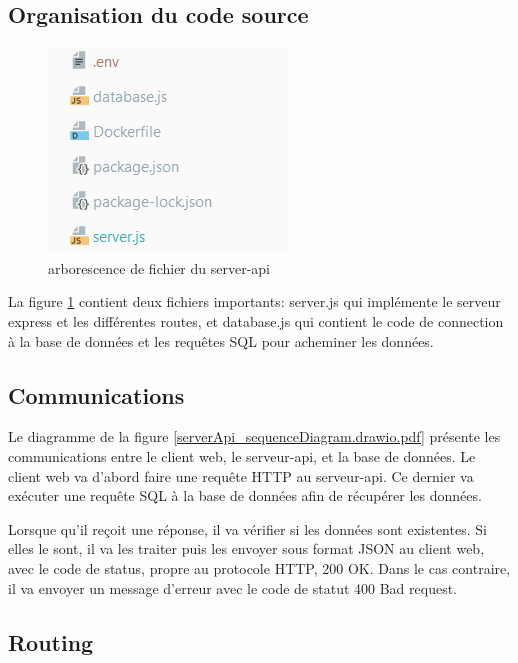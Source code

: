 \documentclass[
    iai, %
    il, %
]{heig-tb}
\begin{document}
\subsection{Organisation du code source}

\begin{figure}[h]
    \centering
    \includegraphics[scale=0.9]{backend_source_code.png}
    \caption{arborescence de fichier du server-api}
    \label{fig:backend_source_files}
\end{figure}

La figure \ref{fig:backend_source_files} contient deux fichiers importants: server.js qui implémente le serveur express et les différentes routes,
et database.js qui contient le code de connection à la base de données et les requêtes SQL pour acheminer les données.

\subsection{Communications}


Le diagramme de la figure \ref{serverApi_sequenceDiagram.drawio.pdf} présente les communications entre le client web,
le serveur-api, et la base de données. Le client web va d'abord faire une requête HTTP au serveur-api.
Ce dernier va exécuter une requête SQL à la base de données afin de récupérer les données.

Lorsque qu'il reçoit une réponse, il va vérifier si les données sont existentes.
Si elles le sont, il va les traiter puis les envoyer sous format JSON au client web, avec le code de status, propre au protocole HTTP, 200 OK.
Dans le cas contraire, il va envoyer un message d'erreur avec le code de statut 400 Bad request.

\subsection{Routing}
\end{document}
